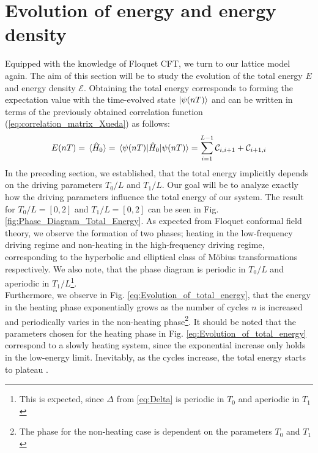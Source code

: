 \documentclass[11pt, a4paper, oneside]{book}
\theoremstyle{definition} %
\begin{document}
\section{Evolution of energy and energy density}
Equipped with the knowledge of Floquet CFT, we turn to our lattice model again. The aim of this section will be to study the evolution of the total energy $E$ and energy density $\mathcal{E}$. Obtaining the total energy corresponds to forming the expectation value with the time-evolved state $\ket{\psi(nT)}$ and can be written in terms of the previously obtained correlation function (\ref{eq:correlation_matrix_Xueda}) as follows:
\begin{equation}
	E(nT) =\expval*{\hat{H}_0} = \mel{\psi(nT)}{\hat{H}_0}{\psi(nT)} = \sum_{i=1}^{L-1} \mathcal{C}_{i, i+1} + \mathcal{C}_{i+1, i}
	\label{eq:Total_Energy}
\end{equation}
In the preceding section, we established, that the total energy implicitly depends on the driving parameters $T_0/L$ and $T_1/L$. Our goal will be to analyze exactly how the driving parameters influence the total energy of our system. The result for $T_0/L = [0, 2]$ and $T_1/L = [0, 2]$ can be seen in Fig. \ref{fig:Phase_Diagram_Total_Energy}. As expected from Floquet conformal field theory, we observe the formation of two phases; heating in the low-frequency driving regime and non-heating in the high-frequency driving regime, corresponding to the hyperbolic and elliptical class of Möbius transformations respectively. We also note, that the phase diagram is periodic in $T_0/L$ and aperiodic in $T_1/L$\footnote{ This is expected, since $\Delta$ from \ref{eq:Delta} is periodic in $T_0$ and aperiodic in $T_1$}. \\

Furthermore, we observe in Fig. \ref{eq:Evolution_of_total_energy}, that the energy in the heating phase exponentially grows as the number of cycles $n$ is increased and periodically varies in the non-heating phase\footnote{The phase for the non-heating case is dependent on the parameters $T_0$ and $T_1$}. It should be noted that the parameters chosen for the heating phase in Fig. \ref{eq:Evolution_of_total_energy} correspond to a slowly heating system, since the exponential increase only holds in the low-energy limit. Inevitably, as the cycles increase, the total energy starts to plateau \cite{Fan}. \\
\end{document}
